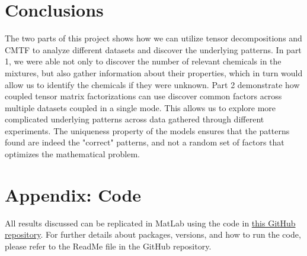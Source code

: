 \section*{Conclusions}
The two parts of this project shows how we can utilize tensor decompositions and CMTF to analyze different datasets and discover the underlying patterns.
In part 1, we were able not only to discover the number of relevant chemicals in the mixtures, but also gather information about their properties, which in turn would allow us to identify the chemicals if they were unknown.
Part 2 demonstrate how coupled tensor matrix factorizations can use discover common factors across multiple datasets coupled in a single mode.
This allows us to explore more complicated underlying patterns across data gathered through different experiments.
The uniqueness property of the models ensures that the patterns found are indeed the "correct" patterns, and not a random set of factors that optimizes the mathematical problem.


\section*{Appendix: Code}
All results discussed can be replicated in MatLab using the code in \href{https://github.com/GauteJ1/Specialized-Syllabus-Project}{this GitHub repository}.
For further details about packages, versions, and how to run the code, please refer to the ReadMe file in the GitHub repository.

